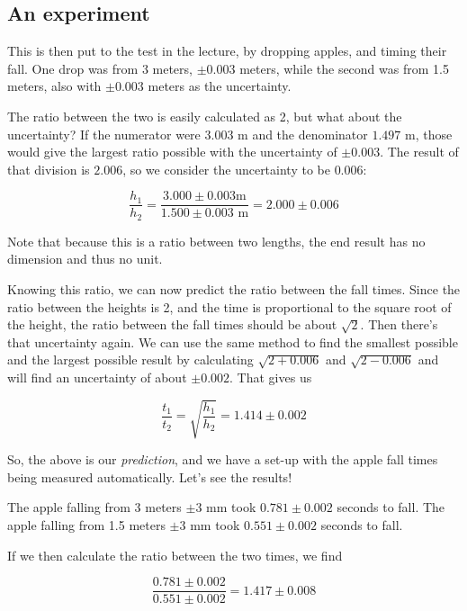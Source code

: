 \subsection{An experiment}

This is then put to the test in the lecture, by dropping apples, and timing their fall. One drop was from 3 meters, $\pm 0.003$ meters, while the second was from 1.5 meters, also with $\pm 0.003$ meters as the uncertainty.

The ratio between the two is easily calculated as 2, but what about the uncertainty? If the numerator were $3.003$ m and the denominator $1.497$ m, those would give the largest ratio possible with the uncertainty of $\pm 0.003$. The result of that division is $2.006$, so we consider the uncertainty to be $0.006$:

\begin{equation}
 \frac{h_1}{h_2} = \frac{3.000 \pm 0.003 \text {m}}{1.500 \pm 0.003 \text{ m}} = 2.000 \pm 0.006
\end{equation}

Note that because this is a ratio between two lengths, the end result has no dimension and thus no unit.

Knowing this ratio, we can now predict the ratio between the fall times. Since the ratio between the heights is 2, and the time is proportional to the square root of the height, the ratio between the fall times should be about $\sqrt{2}$. Then there's that uncertainty again. We can use the same method to find the smallest possible and the largest possible result by calculating $\sqrt{2+0.006}$ and $\sqrt{2-0.006}$ and will find an uncertainty of about $\pm 0.002$. That gives us

\begin{equation}
 \frac{t_1}{t_2} = \sqrt{\frac{h_1}{h_2}} = 1.414 \pm 0.002 \label{eq:applepred}
\end{equation}

So, the above is our \emph{prediction}, and we have a set-up with the apple fall times being measured automatically. Let's see the results!

The apple falling from 3 meters $\pm 3$ mm took $0.781 \pm 0.002$ seconds to fall. The apple falling from 1.5 meters $\pm 3$ mm took $0.551 \pm 0.002$ seconds to fall.

If we then calculate the ratio between the two times, we find

\begin{equation}
\frac{0.781 \pm 0.002}{0.551 \pm 0.002} = 1.417 \pm 0.008
\end{equation}

